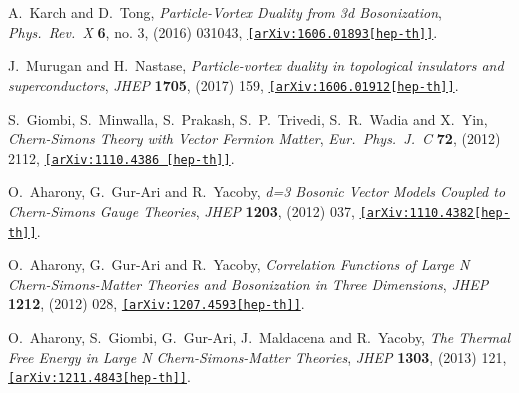 \documentclass[12pt,a4paper]{article}
\begin{document}
\begin{thebibliography}{99}
  A.~Karch and D.~Tong,
 {\it Particle-Vortex Duality from 3d Bosonization},
 {\it Phys.\ Rev.\ X} {\bf 6}, no. 3, (2016) 031043, 
  \href{https://arxiv.org/abs/1606.01893}{\tt[arXiv:1606.01893[hep-th]]}.
  
  J.~Murugan and H.~Nastase,
  {\it Particle-vortex duality in topological insulators and superconductors},
  {\it JHEP} {\bf 1705},  (2017) 159,
  \href{https://arxiv.org/abs/1606.01912}{\tt[arXiv:1606.01912[hep-th]]}.

  S.~Giombi, S.~Minwalla, S.~Prakash, S.~P.~Trivedi, S.~R.~Wadia and X.~Yin,
  {\it Chern-Simons Theory with Vector Fermion Matter},
  {\it Eur.\ Phys.\ J.\ C} {\bf 72}, (2012) 2112,
  \href{https://arxiv.org/abs/1110.4386} {\tt[arXiv:1110.4386 [hep-th]]}.
  
   
  O.~Aharony, G.~Gur-Ari and R.~Yacoby,
  {\it d=3 Bosonic Vector Models Coupled to Chern-Simons Gauge Theories},
  {\it JHEP} {\bf 1203}, (2012) 037, 
  \href{https://arxiv.org/abs/1110.4382}{\tt[arXiv:1110.4382[hep-th]]}.
  
  
  O.~Aharony, G.~Gur-Ari and R.~Yacoby,
 {\it Correlation Functions of Large N Chern-Simons-Matter Theories and Bosonization in Three Dimensions},
 {\it JHEP} {\bf 1212},  (2012) 028,
  \href{https://arxiv.org/abs/1207.4593}
  {\tt[arXiv:1207.4593[hep-th]]}.


  O.~Aharony, S.~Giombi, G.~Gur-Ari, J.~Maldacena and R.~Yacoby,
  {\it The Thermal Free Energy in Large N Chern-Simons-Matter Theories},
  {\it JHEP} {\bf 1303}, (2013) 121, 
  \href{https://arxiv.org/abs/1211.4843}{\tt[arXiv:1211.4843[hep-th]]}.


\end{thebibliography}
\end{document}

